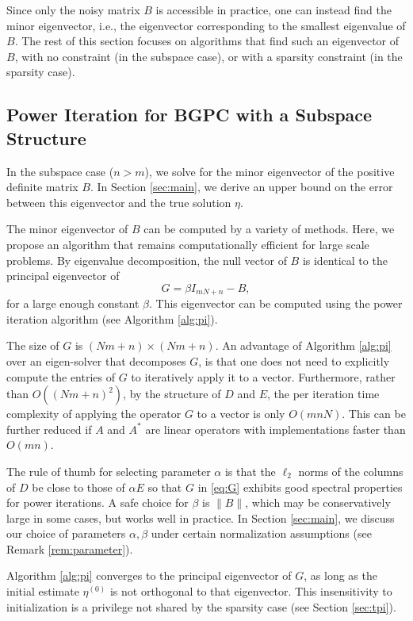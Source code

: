 \documentclass[11pt,journal]{IEEEtran}
\newcommand{\norm}[1]{\|{#1}\|}
\begin{document}
Since only the noisy matrix $B$ is accessible in practice, one can instead find the minor eigenvector, i.e., the eigenvector corresponding to the smallest eigenvalue of $B$. The rest of this section focuses on algorithms that find such an eigenvector of $B$, with no constraint (in the subspace case), or with a sparsity constraint (in the sparsity case).


\subsection{Power Iteration for BGPC with a Subspace Structure}\label{sec:pi}
In the subspace case ($n>m$), we solve for the minor eigenvector of the positive definite matrix $B$. In Section \ref{sec:main}, we derive an upper bound on the error between this eigenvector and the true solution $\eta$. 

The minor eigenvector of $B$ can be computed by a variety of methods. Here, we propose an algorithm that remains computationally efficient for  large scale problems.
By eigenvalue decomposition, the null vector of $B$ is identical to the principal eigenvector of
\begin{equation}
\label{eq:G}
G = \beta I_{mN+n}-B,
\end{equation}
for a large enough constant $\beta$. This eigenvector can be computed using the power iteration algorithm (see Algorithm \ref{alg:pi}). 

The size of $G$ is $(Nm+n)\times (Nm+n)$.
An advantage of Algorithm \ref{alg:pi} over an eigen-solver that decomposes $G$, is that one does not need to explicitly compute the entries of $G$ to iteratively apply it to a vector. Furthermore, rather than $O((Nm+n)^2)$, by the structure of $D$ and $E$, the per iteration time complexity of applying the operator $G$ to a vector is only $O(mnN)$. This can be further reduced if $A$ and $A^*$ are linear operators with implementations faster than $O(mn)$.

The rule of thumb for selecting parameter $\alpha$ is that the $\ell_2$ norms of the columns of $D$ be close to those of $\alpha E$ so that $G$ in \eqref{eq:G} exhibits good spectral properties for power iterations. A safe choice for $\beta$ is $\norm{B}$, which may be conservatively large in some cases, but works well in practice.
In Section \ref{sec:main}, we discuss our choice of parameters $\alpha,\beta$ under certain normalization assumptions (see Remark \ref{rem:parameter}). 

Algorithm \ref{alg:pi} converges to the principal eigenvector of $G$, as long as the initial estimate $\eta^{(0)}$ is not orthogonal to that eigenvector. This insensitivity to initialization is a privilege not shared by the sparsity case (see Section \ref{sec:tpi}).
\end{document}
